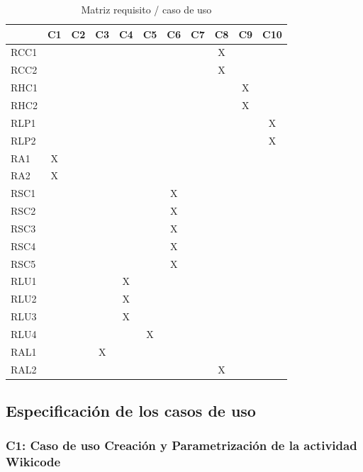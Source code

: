 \newpage

\begin{table}[h]
\centering
\begin{tabular}{ | l | c | c | c | c | c | c | c | c | c | c |}
	\hline
	 & C1 & C2 & C3 &C4 & C5 & C6 & C7 & C8 & C9 & C10 \\
	\hline
	RCC1 & & & & & & & & X & &  \\
	\hline
	RCC2 & & & & & & & & X & &  \\
	\hline
	RHC1 & & & & & & & & & X &  \\
	\hline
	RHC2 & & & & & & & & & X &  \\
	\hline
	RLP1 & & & & & & & & & & X  \\
	\hline
	RLP2 & & & & & & & & & & X  \\
	\hline
	RA1 & X & & & & & & & & &  \\
	\hline
	RA2 & X & & & & & & & & &  \\
	\hline
	RSC1 & & & & & & X & & & &  \\
	\hline
	RSC2 & & & & & & X & & & &  \\
	\hline
	RSC3 & & & & & & X & & & &  \\
	\hline
	RSC4 & & & & & & X & & & &  \\
	\hline
	RSC5 & & & & & & X & & & &  \\
	\hline
	RLU1 & & & & X & & & & & &  \\
	\hline
	RLU2 & & & & X & & & & & &  \\
	\hline
	RLU3 & & & & X & & & & & &  \\
	\hline
	RLU4 & & & & & X & & & & &  \\
	\hline
	RAL1 & & & X & & & & & & &  \\
	\hline
	RAL2 & & & & & & & & X & &  \\
	\hline
\end{tabular}
\caption{Matriz requisito / caso de uso}
\end{table}

\newpage

\subsection{Especificación de los casos de uso}

\subsubsection{C1: Caso de uso Creación y Parametrización de la actividad Wikicode}

